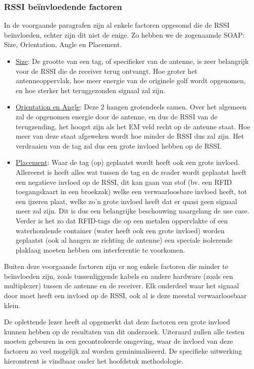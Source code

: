 \subsubsection{RSSI beïnvloedende factoren}
\label{sec:RSSI beïnvloedende factoren}
In de voorgaande paragrafen zijn al enkele factoren opgesomd die de RSSI beïnvloeden, echter zijn dit niet de enige. Zo hebben we de zogenaamde SOAP: Size, Orientation, Angle en Placement.
\begin{itemize}
	\item \underline{Size}:
	De grootte van een tag, of specifieker van de antenne, is zeer belangrijk voor de RSSI die de receiver terug ontvangt. Hoe groter het antenneoppervlak, hoe meer energie van de originele golf wordt opgenomen, en hoe sterker het teruggezonden signaal zal zijn.
	\item \underline{Orientation en Angle}:
	Deze 2 hangen grotendeels samen. Over het algemeen zal de opgenomen energie door de antenne, en dus de RSSI van de terugzending, het hoogst zijn als het EM veld recht op de antenne staat. Hoe meer van deze staat afgeweken wordt hoe minder de RSSI dus zal zijn. Het verdraaien van de tag zal dus een grote invloed hebben op de RSSI. 
	\item \underline{Placement}:
	Waar de tag (op) geplaatst wordt heeft ook een grote invloed. Allereerst is heeft alles wat tussen de tag en de reader wordt geplaatst heeft een negatieve invloed op de RSSI, dit kan gaan van stof (bv. een RFID toegangskaart in een broekzak) welke een verwaarloosbare invloed heeft, tot een ijzeren plaat, welke zo'n grote invloed heeft dat er quasi geen signaal meer zal zijn. Dit is dus een belangrijke beschouwing naargelang de use case. Verder is het zo dat RFID-tags die op een metalen oppervlakte of een waterhoudende container (water heeft ook een grote invloed) worden geplaatst (ook al hangen ze richting de antenne) een speciale isolerende plaklaag moeten hebben om interferentie te voorkomen.
\end{itemize}

Buiten deze voorgaande factoren zijn er nog enkele factoren die minder te beïnvloeden zijn, zoals tussenliggende kabels en andere hardware (zoals een multiplexer) tussen de antenne en de receiver. Elk onderdeel waar het signaal door moet heeft een invloed op de RSSI, ook al is deze meestal verwaarloosbaar klein.\autocite{Armstrong2013}

De oplettende lezer heeft al opgemerkt dat deze factoren een grote invloed kunnen hebben op de resultaten van dit onderzoek. Uiteraard zullen alle testen moeten gebeuren in een gecontroleerde omgeving, waar de invloed van deze factoren zo veel mogelijk zal worden geminimaliseerd. De specifieke uitwerking hieromtrent is vindbaar onder het hoofdstuk methodologie.

